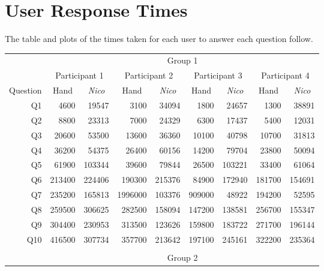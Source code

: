 \documentclass[12pt,twoside,notitlepage,xetex]{report}
\begin{document}
{\chapter{User Response Times}

The table and plots of the times taken for each user to answer each question follow.

\begin{center}
\begin{table}[H]
\begin{center}
\begin{tabular}{|r||r|r||r|r||r|r||r|r|}
\cline{2-9}
\multicolumn{1}{c|}{} & \multicolumn{8}{c|}{Group 1}\\ \cline{2-9}
\multicolumn{1}{c|}{} & \multicolumn{2}{c||}{Participant 1} & \multicolumn{2}{c||}{Participant 2} & \multicolumn{2}{c||}{Participant 3} & \multicolumn{2}{c|}{Participant 4}\\ \hline
\multicolumn{1}{|c||}{Question} & \multicolumn{1}{c|}{Hand} & \multicolumn{1}{c||}{\emph{Nico}} & \multicolumn{1}{c|}{Hand} & \multicolumn{1}{c||}{\emph{Nico}} & \multicolumn{1}{c|}{Hand} & \multicolumn{1}{c||}{\emph{Nico}} & \multicolumn{1}{c|}{Hand} & \multicolumn{1}{c|}{\emph{Nico}}\\ \hline \hline
Q1 & 4600 & 19547 & 3100 & 34094 & 1800 & 24657 & 1300 & 38891\\ \hline
Q2 & 8800 & 23313 & 7000 & 24329 & 6300 & 17437 & 5400 & 12031\\ \hline
Q3 & 20600 & 53500 & 13600 & 36360 & 10100 & 40798 & 10700 & 31813\\ \hline
Q4 & 36200 & 54375 & 26400 & 60156 & 14200 & 79704 & 23800 & 50094\\ \hline
Q5 & 61900 & 103344 & 39600 & 79844 & 26500 & 103221 & 33400 & 61064\\ \hline
Q6 & 213400 & 224406 & 190300 & 215376 & 84900 & 172940 & 181700 & 154691\\ \hline
Q7 & 235200 & 165813 & 1996000 & 103376 & 909000 & 48922 & 194200 & 52595\\ \hline
Q8 & 259500 & 306625 & 282500 & 158094 & 147200 & 138581 & 256700 & 155347\\ \hline
Q9 & 304400 & 230953 & 313500 & 123626 & 159800 & 183722 & 271700 & 196144\\ \hline
Q10 & 416500 & 307734 & 357700 & 213642 & 197100 & 245161 & 322200 & 235364\\ \hline
\multicolumn{9}{c}{}\\ \cline{2-9}
\multicolumn{1}{c|}{} & \multicolumn{8}{c|}{Group 2}\\ \cline{2-9}

\end{tabular}
\end{center}
\end{table}
\end{center}}
\end{document}
